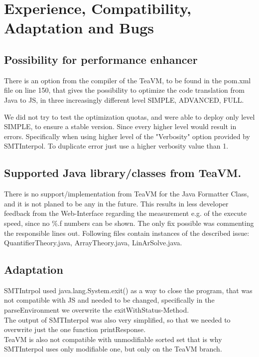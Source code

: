 \documentclass[12pt]{article}
\begin{document}
\section{Experience, Compatibility, Adaptation and Bugs}

\subsection{Possibility for performance enhancer}
There is an option from the compiler of the TeaVM, to be found in the pom.xml file on line 150, that gives the possibility to optimize the code translation from Java to JS, in three increasingly different level SIMPLE, ADVANCED, FULL.

We did not try to test the optimization quotas, and were able to deploy only level SIMPLE, to ensure a stable version.
Since every higher level would result in  errors. Specifically when using higher level of the "Verbosity" option provided by SMTInterpol. To duplicate error just use a higher verbosity value than 1.

\subsection{Supported Java library/classes from TeaVM.}
There is no support/implementation from TeaVM for the Java Formatter Class, and it is not planed to be any in the future\cite{4}. This results in less developer feedback from the Web-Interface regarding the measurement e.g. of the execute speed, since no \%.f numbers can be shown. The only fix possible was commenting the responsible lines out.
Following files contain instances of the described issue: QuantifierTheory.java, ArrayTheory.java, LinArSolve.java.

\subsection{Adaptation}
SMTIntrpol used java.lang.System.exit() as a way to close the program, that was not compatible with JS and needed to be changed, specifically in the parseEnvironment we overwrite the exitWithStatus-Method. \\

The output of SMTInterpol was also very simplified, so that we needed to overwrite just the one function printResponse.\\

TeaVM is also not compatible with unmodifiable sorted set that is why SMTInterpol uses only modifiable one, but only on the TeaVM branch.
\end{document}
